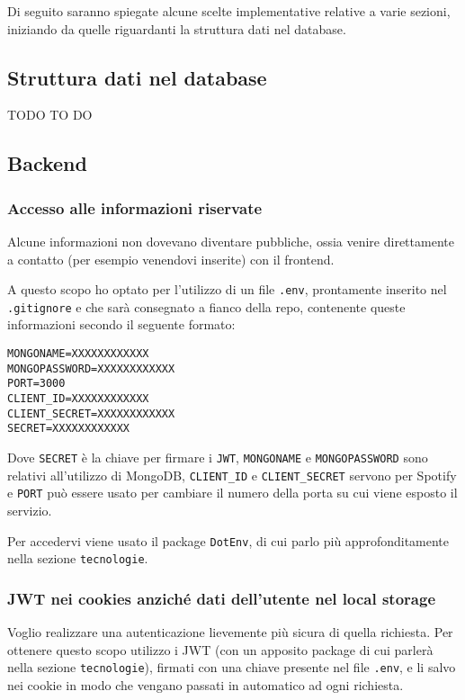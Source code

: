 Di seguito saranno spiegate alcune scelte implementative relative a varie sezioni, iniziando da quelle riguardanti la struttura dati nel database.
\subsection{Struttura dati nel database}
TODO TO DO
\subsection{Backend}
\subsubsection{Accesso alle informazioni riservate}
Alcune informazioni non dovevano diventare pubbliche, ossia venire direttamente a contatto (per esempio venendovi inserite) con il frontend.

A questo scopo ho optato per l'utilizzo di un file \verb|.env|, prontamente inserito nel \verb|.gitignore| e che sarà consegnato a fianco della repo, contenente queste informazioni secondo il seguente formato:
\begin{lstlisting}
MONGONAME=XXXXXXXXXXXX
MONGOPASSWORD=XXXXXXXXXXXX
PORT=3000
CLIENT_ID=XXXXXXXXXXXX
CLIENT_SECRET=XXXXXXXXXXXX
SECRET=XXXXXXXXXXXX
\end{lstlisting}
Dove \verb|SECRET| è la chiave per firmare i \verb|JWT|, \verb|MONGONAME| e \verb|MONGOPASSWORD| sono relativi all'utilizzo di MongoDB, \verb|CLIENT_ID| e \verb|CLIENT_SECRET| servono per Spotify e \verb|PORT| può essere usato per cambiare il numero della porta su cui viene esposto il servizio.

Per accedervi viene usato il package \verb|DotEnv|, di cui parlo più approfonditamente nella sezione \verb|tecnologie|.
\subsubsection{JWT nei cookies anziché dati dell'utente nel local storage}
Voglio realizzare una autenticazione lievemente più sicura di quella richiesta. Per ottenere questo scopo utilizzo i JWT (con un apposito package di cui parlerà nella sezione \verb|tecnologie|), firmati con una chiave presente nel file \verb|.env|, e li salvo nei cookie in modo che vengano passati in automatico ad ogni richiesta.

